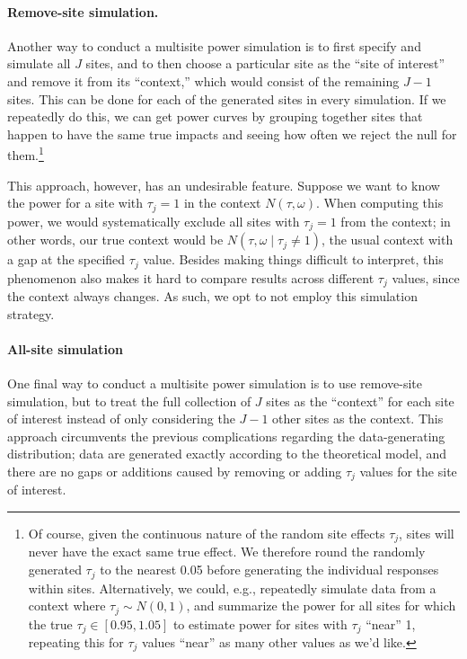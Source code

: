 \documentclass[]{article}
\begin{document}
\paragraph{Remove-site simulation.} Another way to conduct a multisite power simulation is to first specify and simulate all $J$ sites, and to then choose a particular site as the ``site of interest'' and remove it from its ``context,'' which would consist of the remaining $J-1$ sites.
This can be done for each of the generated sites in every simulation.
If we repeatedly do this, we can get power curves by grouping together sites that happen to have the same true impacts and seeing how often we reject the null for them.\footnote{Of course, given the continuous nature of the random site effects $\tau_j$, sites will never have the exact same true effect.
	We therefore round the randomly generated $\tau_j$ to the nearest 0.05 before generating the individual responses within sites.
	Alternatively, we could, e.g., repeatedly simulate data from a context where $\tau_j \sim N(0, 1)$, and summarize the power for all sites for which the true $\tau_j \in [0.95, 1.05]$ to estimate  power for sites with $\tau_j$ ``near'' 1, repeating this for $\tau_j$ values ``near'' as many other values as we'd like.}

This approach, however, has an undesirable feature.
Suppose we want to know the power for a site with $\tau_j = 1$ in the context $N(\tau, \omega)$.
When computing this power, we would systematically exclude all sites with $\tau_j = 1$ from the context; in other words, our true context would be $N(\tau, \omega \mid \tau_j \neq 1)$, the usual context with a gap at the specified $\tau_j$ value.
Besides making things difficult to interpret, this phenomenon also makes it hard to compare results across different $\tau_j$ values, since the context always changes.
As such, we opt to not employ this simulation strategy.

\paragraph{All-site simulation} One final way to conduct a multisite power simulation is to use remove-site simulation, but to treat the full collection of $J$ sites as the ``context'' for each site of interest instead of only considering the $J-1$ other sites as the context.
This approach circumvents the previous complications regarding the data-generating distribution; data are generated exactly according to the theoretical model, and there are no gaps or additions caused by removing or adding $\tau_j$ values for the site of interest.
\end{document}
